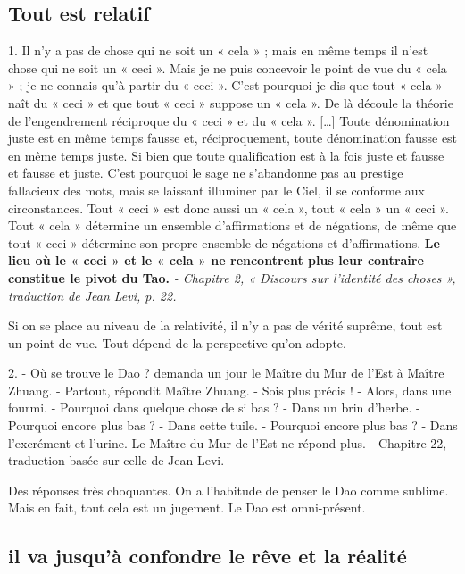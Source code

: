   \subsection{Tout est relatif}
  \begin{singlequote}
      1. Il n’y a pas de chose qui ne soit un « cela » ; mais en même temps il n’est chose qui ne soit un  « ceci ». Mais je ne puis concevoir le point de vue du « cela » ; je ne connais qu’à partir du « ceci ». C’est pourquoi je dis que tout « cela » naît du « ceci » et que tout « ceci » suppose un « cela ». De là découle la théorie de l’engendrement réciproque du « ceci » et du « cela ». […] Toute dénomination juste est en même temps fausse et, réciproquement, toute dénomination fausse est en même temps juste. Si bien que toute qualification est à la fois juste et fausse et fausse et juste. C’est pourquoi le sage ne s’abandonne pas au prestige fallacieux des mots, mais se laissant illuminer par le Ciel, il se conforme aux circonstances. Tout « ceci » est donc aussi un « cela », tout « cela » un « ceci ». Tout « cela » détermine un ensemble d’affirmations et de négations, de même que tout « ceci » détermine son propre ensemble de négations et d’affirmations. \textbf{Le lieu où le « ceci » et le « cela » ne rencontrent plus leur contraire constitue le pivot du Tao.  }
      \textit{\small - Chapitre 2, « Discours sur l’identité des choses », traduction de Jean Levi, p. 22. }
  \end{singlequote}
  

Si on se place au niveau de la relativité, il n'y a pas de vérité suprême, tout est un point de vue. Tout dépend de la perspective qu'on adopte.

    
  \begin{singlequote}
      2. - Où se trouve le Dao ? demanda un jour le Maître du Mur de l’Est à Maître Zhuang. - Partout, répondit Maître Zhuang. - Sois plus précis ! - Alors, dans une fourmi. - Pourquoi dans quelque chose de si bas ? - Dans un brin d’herbe. - Pourquoi encore plus bas ? - Dans cette tuile. - Pourquoi encore plus bas ? - Dans l’excrément et l’urine. Le Maître du Mur de l’Est ne répond plus.  - Chapitre 22, traduction basée sur celle de Jean Levi. 
  \end{singlequote}
  
    Des réponses très choquantes. On a l'habitude de penser le Dao comme sublime. Mais en fait, tout cela est un jugement. Le Dao est omni-présent. 

\subsection{il va jusqu'à confondre le rêve et la réalité}
    
